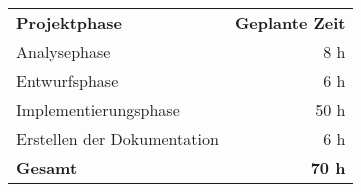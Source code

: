 \begin{tabular}{lr}
\rowcolor{heading}\textbf{Projektphase} & \textbf{Geplante Zeit} \\
Analysephase & 8 h \\
\rowcolor{odd}Entwurfsphase & 6 h \\
Implementierungsphase & 50 h \\
\rowcolor{odd}Erstellen der Dokumentation & 6 h \\
\hline
\hline
\rowcolor{odd}\textbf{Gesamt} & \textbf{70 h} \\
\end{tabular}
